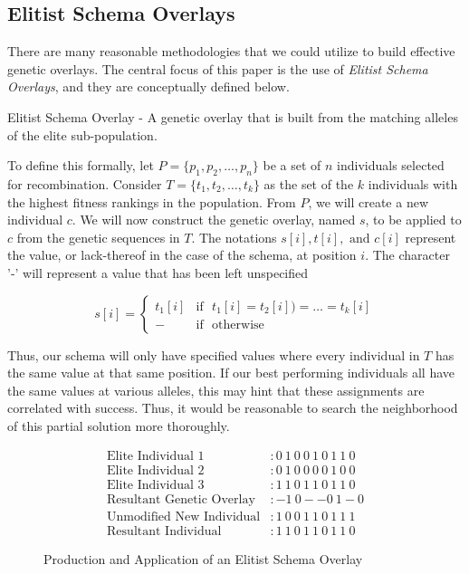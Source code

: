 \subsection*{Elitist Schema Overlays}
There are many reasonable methodologies that we could utilize to build effective genetic overlays. The central focus of this paper is the use of \emph{Elitist Schema Overlays}, and they are conceptually defined below.

\begin{eschema}
Elitist Schema Overlay - A genetic overlay that is built from the matching alleles of the elite sub-population.
\end{eschema}

To define this formally, let $P = \{p_1,p_2,\ldots,p_n\}$ be a set of $n$ individuals selected for recombination. Consider $T=\{t_1,t_2,\ldots,t_k\}$ as the set of the $k$ individuals with the highest fitness rankings in the population. From $P$, we will create a new individual $c$.  We will now construct the genetic overlay, named $s$, to be applied to $c$ from the genetic sequences in $T$. The notations $s[i], t[i], \text{ and } c[i]$ represent the value, or lack-thereof in the case of the schema, at position $i$. The character '-' will represent a value that has been left unspecified
 
 \begin{displaymath}
   s[i] = \left\{
     \begin{array}{cl}
       t_1[i] & \text{if~ } t_1[i] = t_2[i]) = \ldots = t_k[i] \\
       - & \text{if~ } \text{otherwise} 
     \end{array}
   \right.
\end{displaymath} 

Thus, our schema will only have specified values where every individual in $T$ has the same value at that same position. If our best performing individuals all have the same values at various alleles, this may hint that these assignments are correlated with success. Thus, it would be reasonable to search the neighborhood of this partial solution more thoroughly. 
\begin{figure}[h!]
\centering 
\begin{align*}
\text{Elite Individual 1} &: 0~1~0~0~1~0~1~1~0 			\\
\text{Elite Individual 2} &: 0~1~0~0~0~0~1~0~0 			\\
\text{Elite Individual 3} &: 1~1~0~1~1~0~1~1~0 			\\
\text{Resultant Genetic Overlay} &:   -1~0--0~1-0			\\
\text{Unmodified New Individual} &: 1~0~0~1~1~0~1~1~1	\\		
\text{Resultant Individual} &: 1~1~0~1~1~0~1~1~0
\end{align*}
\caption{Production and Application of an Elitist Schema Overlay}
\label{ESO-Fig}
\end{figure}

